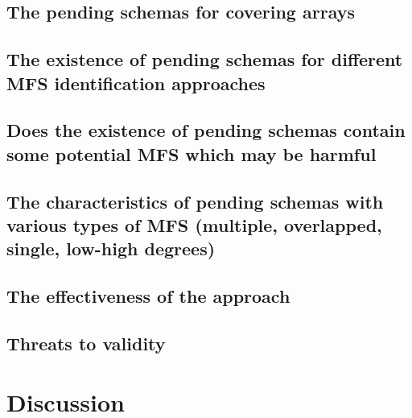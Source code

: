{\subsection{The pending schemas for covering arrays}

%

\subsection{The existence of pending schemas for different MFS identification approaches}

%

\subsection{Does the existence of pending schemas contain some potential MFS which may be harmful}


\subsection{The characteristics of pending schemas with various types of MFS (multiple, overlapped, single, low-high degrees)}



\subsection{The effectiveness of the approach}



\subsection{Threats to validity}


\section{Discussion}\label{sec:discussion}


}
